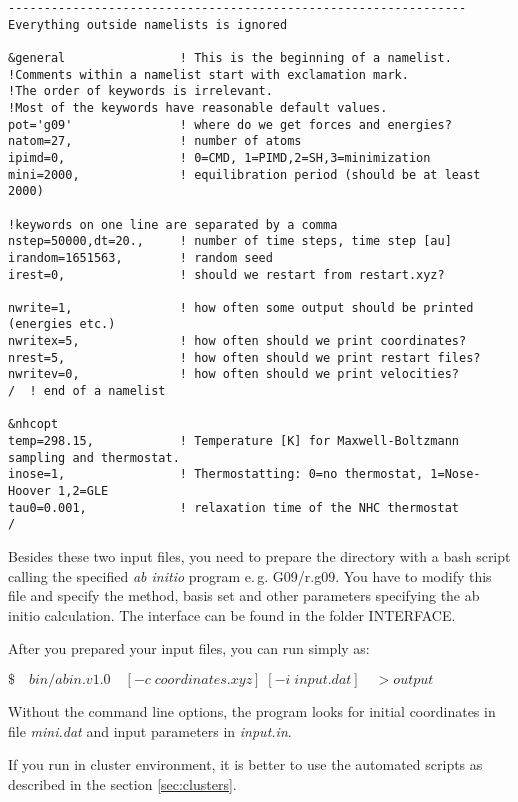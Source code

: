 \documentclass[12pt,a4paper]{article}
\begin{document}
\begin{verbatim}
----------------------------------------------------------------
Everything outside namelists is ignored

&general                ! This is the beginning of a namelist.
!Comments within a namelist start with exclamation mark.
!The order of keywords is irrelevant.
!Most of the keywords have reasonable default values.
pot='g09'               ! where do we get forces and energies?
natom=27,               ! number of atoms
ipimd=0,                ! 0=CMD, 1=PIMD,2=SH,3=minimization
mini=2000,              ! equilibration period (should be at least 2000)

!keywords on one line are separated by a comma
nstep=50000,dt=20.,     ! number of time steps, time step [au]
irandom=1651563,        ! random seed
irest=0,                ! should we restart from restart.xyz?

nwrite=1,               ! how often some output should be printed (energies etc.)
nwritex=5,              ! how often should we print coordinates?
nrest=5,                ! how often should we print restart files?
nwritev=0,              ! how often should we print velocities?
/  ! end of a namelist

&nhcopt
temp=298.15,            ! Temperature [K] for Maxwell-Boltzmann sampling and thermostat.
inose=1,                ! Thermostatting: 0=no thermostat, 1=Nose-Hoover 1,2=GLE
tau0=0.001,             ! relaxation time of the NHC thermostat
/

\end{verbatim}

Besides these two input files, you need to prepare the directory with a bash script calling the specified \textit{ab initio} program e.\,g. G09/r.g09. You have to modify this file and specify the method, basis set and other parameters specifying the ab initio calculation. The interface can be found in the folder INTERFACE.

After you prepared your input files, you can run \abin simply as:

\bigskip
\colorbox{black!20}{$ \$ \quad bin/abin.v1.0\quad [-c \; coordinates.xyz]\; [-i\; input.dat]\quad  > output $}

\bigskip \noindent
Without the command line options, the program looks for initial coordinates in file \textit{mini.dat}
and input parameters in \textit{input.in}.

If you run \abin in cluster environment, it is better to use the automated scripts as described in the section \ref{sec:clusters}.
\end{document}
